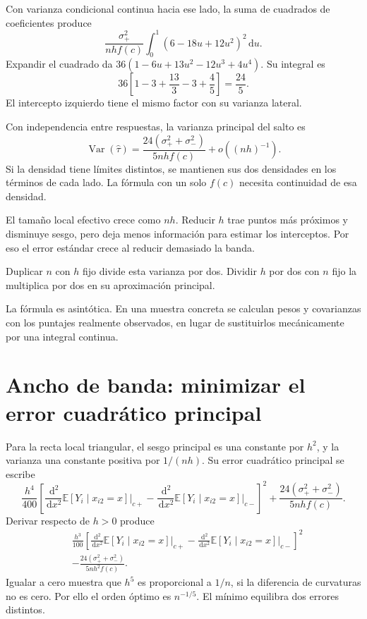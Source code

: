 \documentclass[11pt,a4paper]{article}
\newcommand{\E}{\mathbb E}
\newcommand{\dd}{\,\mathrm d}
\DeclareMathOperator{\Var}{Var}
\begin{document}
Con varianza condicional continua hacia
ese lado, la suma de cuadrados
de coeficientes produce
\[
\frac{\sigma_+^2}{nhf(c)}
\int_0^1(6-18u+12u^2)^2\dd u.
\]
Expandir el cuadrado da
\(36(1-6u+13u^2-12u^3+4u^4)\).
Su integral es
\[
36\left[1-3+\frac{13}{3}-3+\frac45\right]
=\frac{24}{5}.
\]
El intercepto izquierdo tiene el mismo
factor con su varianza lateral.

Con independencia entre respuestas,
la varianza principal del salto es
\[
\Var(\widehat\tau)
=\frac{24(\sigma_+^2+\sigma_-^2)}
{5nhf(c)}+o((nh)^{-1}).
\]
Si la densidad tiene límites distintos,
se mantienen sus dos densidades
en los términos de cada lado.
La fórmula con un solo \(f(c)\)
necesita continuidad de esa densidad.

El tamaño local efectivo crece como \(nh\).
Reducir \(h\) trae puntos más próximos
y disminuye sesgo, pero deja menos información
para estimar los interceptos.
Por eso el error estándar crece
al reducir demasiado la banda.

\begin{ejemplo}[Escala]
Duplicar \(n\) con \(h\) fijo
divide esta varianza por dos.
Dividir \(h\) por dos con \(n\) fijo
la multiplica por dos en su aproximación principal.
\end{ejemplo}
La fórmula es asintótica.
En una muestra concreta se calculan
pesos y covarianzas con los puntajes realmente observados,
en lugar de sustituirlos mecánicamente
por una integral continua.

\clearpage
\section{Ancho de banda: minimizar el error cuadrático principal}\label{unidad35}
Para la recta local triangular, el sesgo principal
es una constante por \(h^2\), y la varianza
una constante positiva por \(1/(nh)\).
Su error cuadrático principal se escribe
\[
\frac{h^4}{400}
\left[
\frac{\dd^2}{\dd x^2}\E[Y_i\mid x_{i2}=x]\bigg|_{c+}
-\frac{\dd^2}{\dd x^2}\E[Y_i\mid x_{i2}=x]\bigg|_{c-}
\right]^2
+\frac{24(\sigma_+^2+\sigma_-^2)}{5nhf(c)}.
\]
Derivar respecto de \(h>0\) produce
\[
\begin{aligned}
&\frac{h^3}{100}
\left[
\frac{\dd^2}{\dd x^2}\E[Y_i\mid x_{i2}=x]\bigg|_{c+}
-\frac{\dd^2}{\dd x^2}\E[Y_i\mid x_{i2}=x]\bigg|_{c-}
\right]^2\\
&-\frac{24(\sigma_+^2+\sigma_-^2)}{5nh^2f(c)}.
\end{aligned}
\]
Igualar a cero muestra que \(h^5\)
es proporcional a \(1/n\), si la
diferencia de curvaturas no es cero.
Por ello el orden óptimo es \(n^{-1/5}\).
El mínimo equilibra dos errores distintos.
\end{document}
